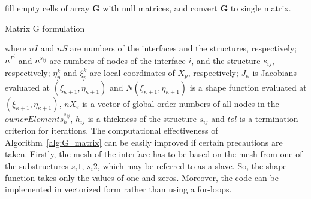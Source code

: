 \documentclass[materials,article,submit,moreauthors,pdftex]{Definitions/mdpi}
\begin{document}
{\begin{algorithm}[H]
{{		}
	}
	fill empty cells of array \(\mathbf{G}\) with null matrices, and convert \(\mathbf{G}\) to single matrix.
	\caption{Matrix G formulation}
	\label{alg:G_matrix}
\end{algorithm}
where \(nI\) and \(nS\) are numbers of the interfaces and the structures, respectively; \(n^{\Gamma^i}\) and \(n^{s_{ij}}\) are numbers of nodes of the interface \(i\), and the structure \(s_{ij}\), respectively; \(\eta^k_p\) and  \(\xi^k_p\) are local coordinates of \(X_p\), respectively; \(J_{\kappa}\) is Jacobians evaluated at \((\xi_{\kappa+1},\eta_{\kappa+1})\) and \(N(\xi_{\kappa+1},\eta_{\kappa+1})\) is a shape function evaluated at \((\xi_{\kappa+1},\eta_{\kappa+1})\), \(nX_e\) is a vector of global order numbers of all nodes in the \(ownerElements^{s_{ij}}_k\), \(h_{ij}\) is a thickness of the structure \(s_{ij}\) and \(tol\) is a termination criterion for iterations.
The computational effectiveness of Algorithm~\ref{alg:G_matrix} can be easily improved if certain precautions are taken.
Firstly, the mesh of the interface has to be based on the mesh from one of the substructures \(s_i1\), \(s_i2\), which may be referred to as a slave.
So, the shape function takes only the values of one and zeros.
Moreover, the code can be implemented in vectorized form rather than using a for-loops.

}
\end{document}
